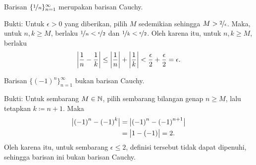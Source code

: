 \begin{example}
Barisan $\{ \nicefrac{1}{n} \}_{n=1}^\infty$ merupakan barisan Cauchy.

Bukti:  Untuk $\epsilon > 0$ yang diberikan, pilih $M$ sedemikian sehingga
$M > \nicefrac{2}{\epsilon}$.  Maka, untuk $n,k \geq M$,
berlaku $\nicefrac{1}{n} < \nicefrac{\epsilon}{2}$
dan
$\nicefrac{1}{k} < \nicefrac{\epsilon}{2}$.  Oleh karena itu, untuk $n, k \geq M$,
berlaku
\begin{equation*}
\left\lvert {\frac{1}{n} - \frac{1}{k}} \right\rvert
\leq
\left\lvert {\frac{1}{n}} \right\rvert + \left\lvert {\frac{1}{k}} \right\rvert
< \frac{\epsilon}{2} + \frac{\epsilon}{2} = \epsilon.
\end{equation*}
\end{example}

\begin{example}
Barisan $\bigl\{ {(-1)}^n \bigr\}_{n=1}^\infty$ bukan barisan Cauchy.

Bukti:
Untuk sembarang $M \in {\mathbb{N}}$, pilih sembarang bilangan genap $n \geq M$, lalu
tetapkan $k \coloneqq n+1$.  Maka
\begin{equation*}
\begin{split}
\bigl\lvert {{(-1)}^n - {(-1)}^k} \bigr\rvert
& =
\bigl\lvert {{(-1)}^n - {(-1)}^{n+1}} \bigr\rvert
\\
& =
\bigl\lvert {1 - (-1)} \bigr\rvert = 2 .
\end{split}
\end{equation*}
Oleh karena itu, untuk sembarang $\epsilon \leq 2$, definisi tersebut tidak dapat dipenuhi,
sehingga barisan ini bukan barisan Cauchy.
\end{example}

%

